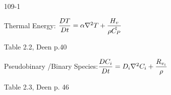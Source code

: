 \begin{mitframe}{109-1}
\begin{listone}
	\item Thermal Energy: $\dfrac{\elecdisplace\Temp}{\elecdisplace\timet}=\tdiff\nabla^2\Temp+\dfrac{\enthalpy_{\vvel}}{\dens\hat{\cp}}$
    \begin{listtwo}
    	\item Table 2.2, Deen p.40
    \end{listtwo}
	\item Pseudobinary /Binary Species:$\dfrac{\elecdisplace\conc_{\state}}{\elecdisplace\timet}=\pdiff\nabla^2\conc_{\state}+\dfrac{\gasconst_{\vvel_{\state}}}{\dens}$
    	\begin{listtwo}
        	\item Table 2.3, Deen p. 46
        \end{listtwo}
\end{listone}    
\end{mitframe}